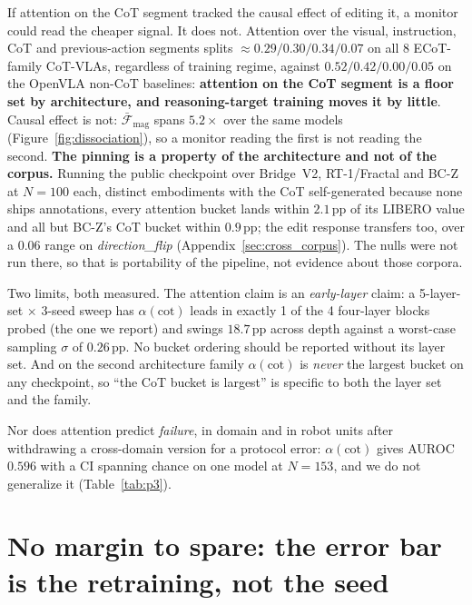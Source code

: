 \documentclass[11pt]{article}
\begin{document}
If attention on the CoT segment tracked the causal effect of editing it, a monitor could read the cheaper signal. It does not. Attention over the visual, instruction, CoT and previous-action segments splits $\approx 0.29/0.30/0.34/0.07$ on all 8 ECoT-family CoT-VLAs, regardless of training regime, against $0.52/0.42/0.00/0.05$ on the OpenVLA non-CoT baselines: \textbf{attention on the CoT segment is a floor set by architecture, and reasoning-target training moves it by little}. Causal effect is not: $\bar{\mathcal{F}}_{\text{mag}}$ spans $5.2\times$ over the same models (Figure~\ref{fig:dissociation}), so a monitor reading the first is not reading the second. \textbf{The pinning is a property of the architecture and not of the corpus.} Running the public checkpoint over Bridge~V2, RT-1/Fractal and BC-Z at $N{=}100$ each, distinct embodiments with the CoT self-generated because none ships annotations, every attention bucket lands within $2.1$\,pp of its LIBERO value and all but BC-Z's CoT bucket within $0.9$\,pp; the edit response transfers too, over a $0.06$ range on \emph{direction\_flip} (Appendix~\ref{sec:cross_corpus}). The nulls were not run there, so that is portability of the pipeline, not evidence about those corpora.

Two limits, both measured. The attention claim is an \emph{early-layer} claim: a 5-layer-set $\times$ 3-seed sweep has $\alpha(\text{cot})$ leads in exactly 1 of the 4 four-layer blocks probed (the one we report) and swings $18.7$\,pp across depth against a worst-case sampling $\sigma$ of $0.26$\,pp. No bucket ordering should be reported without its layer set. And on the second architecture family $\alpha(\text{cot})$ is \emph{never} the largest bucket on any checkpoint, so ``the CoT bucket is largest'' is specific to both the layer set and the family.

Nor does attention predict \emph{failure}, in domain and in robot units after withdrawing a cross-domain version for a protocol error: $\alpha(\text{cot})$ gives AUROC $0.596$ with a CI spanning chance on one model at $N{=}153$, and we do not generalize it (Table~\ref{tab:p3}).

\section{No margin to spare: the error bar is the retraining, not the seed}
\label{sec:variance}
\end{document}
